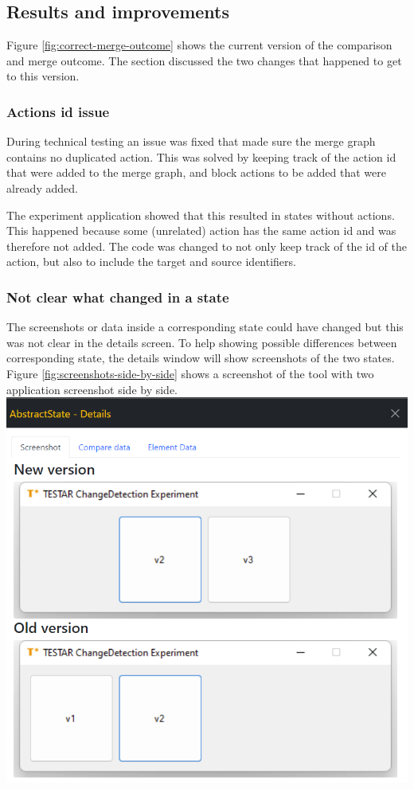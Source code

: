 \subsection{Results and improvements}
Figure \ref{fig:correct-merge-outcome} shows the current version of the comparison and merge outcome. The section discussed the two changes that happened to get to this version.

\subsubsection{Actions id issue}
During technical testing an issue was fixed that made sure the merge graph contains no duplicated action. This was solved by keeping track of the action id that were added to the merge graph, and block actions to be added that were already added.

The experiment application showed that this resulted in states without actions. This happened because some (unrelated) action has the same action id and was therefore not added. The code was changed to not only keep track of the id of the action, but also to include the target and source identifiers.  

\subsubsection{Not clear what changed in a state}
The screenshots or data inside a corresponding state could have changed but this was not clear in the details screen. To help showing possible differences between corresponding state, the details window will show screenshots of the two states. Figure \ref{fig:screenshots-side-by-side} shows a screenshot of the tool with two application screenshot side by side.\\

\begingroup
\captionsetup{type=figure}
\includegraphics[scale=0.6]{images/6-Screenshot-Side-By-Side.png}
\label{fig:screenshots-side-by-side}
\endgroup

